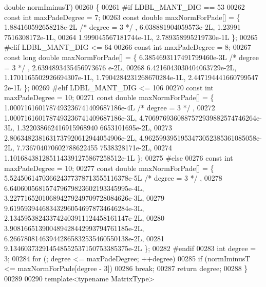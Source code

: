 \begin{DoxyCode}
{      double} normIminusT)
00260 \{
00261 \textcolor{preprocessor}{#if   LDBL\_MANT\_DIG == 53}
00262   \textcolor{keyword}{const} \textcolor{keywordtype}{int} maxPadeDegree = 7;
00263   \textcolor{keyword}{const} \textcolor{keywordtype}{double} maxNormForPade[] = \{ 1.884160592658218e-2L \textcolor{comment}{/* degree = 3 */} , 6.038881904059573e-2L, 1.23991
      7516308172e-1L,
00264       1.999045567181744e-1L, 2.789358995219730e-1L \};
00265 \textcolor{preprocessor}{#elif LDBL\_MANT\_DIG <= 64}
00266   \textcolor{keyword}{const} \textcolor{keywordtype}{int} maxPadeDegree = 8;
00267   \textcolor{keyword}{const} \textcolor{keywordtype}{long} \textcolor{keywordtype}{double} maxNormForPade[] = \{ 6.3854693117491799460e-3L \textcolor{comment}{/* degree = 3 */} , 2.6394893435456973676
      e-2L,
00268       6.4216043030404063729e-2L, 1.1701165502926694307e-1L, 1.7904284231268670284e-1L, 2.447194441660799547
      2e-1L \};
00269 \textcolor{preprocessor}{#elif LDBL\_MANT\_DIG <= 106}
00270   \textcolor{keyword}{const} \textcolor{keywordtype}{int} maxPadeDegree = 10;
00271   \textcolor{keyword}{const} \textcolor{keywordtype}{double} maxNormForPade[] = \{ 1.0007161601787493236741409687186e-4L \textcolor{comment}{/* degree = 3 */} ,
00272       1.0007161601787493236741409687186e-3L, 4.7069769360887572939882574746264e-3L, 1.322038662416915968940
      6653101695e-2L,
00273       2.8063482381631737920612944054906e-2L, 4.9625993951953473052385361085058e-2L, 7.736704070602788622455
      7538328171e-2L,
00274       1.1016843812851143391275867258512e-1L \};
00275 \textcolor{preprocessor}{#else}
00276   \textcolor{keyword}{const} \textcolor{keywordtype}{int} maxPadeDegree = 10;
00277   \textcolor{keyword}{const} \textcolor{keywordtype}{double} maxNormForPade[] = \{ 5.524506147036624377378713555116378e-5L \textcolor{comment}{/* degree = 3 */} ,
00278       6.640600568157479679823602193345995e-4L, 3.227716520106894279249709728084626e-3L,
00279       9.619593944683432960546978734646284e-3L, 2.134595382433742403911124458161147e-2L,
00280       3.908166513900489428442993794761185e-2L, 6.266780814639442865832535460550138e-2L,
00281       9.134603732914548552537150753385375e-2L \};
00282 \textcolor{preprocessor}{#endif}
00283   \textcolor{keywordtype}{int} degree = 3;
00284   \textcolor{keywordflow}{for} (; degree <= maxPadeDegree; ++degree)
00285     \textcolor{keywordflow}{if} (normIminusT <= maxNormForPade[degree - 3])
00286       \textcolor{keywordflow}{break};
00287   \textcolor{keywordflow}{return} degree;
00288 \}
00289 
00290 \textcolor{keyword}{template}<\textcolor{keyword}{typename} MatrixType>

\end{DoxyCode}

